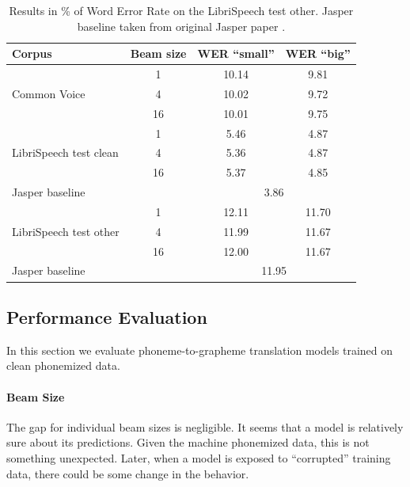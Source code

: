 \begin{table}[H]
	\centering
	\begin{tabular}{lc|cc}
		\bf Corpus & \bf Beam size & \bf WER ``small''& \bf WER ``big'' \\
		\hline
		\multirow{3}{*}{Common Voice}    & 1    &10.14    &    9.81    \\
		& 4    & 10.02    &    9.72    \\
		& 16    &10.01    & 9.75    \\
		\hline
		
		\multirow{3}{*}{LibriSpeech test clean}    & 1    &    5.46 &    4.87    \\
		& 4    &  5.36 &    4.87    \\
		& 16     &5.37    & 4.85    \\
		\multicolumn{2}{l|}{Jasper baseline} & \multicolumn{2}{c}{3.86} \\
		\hline
		
		\multirow{3}{*}{LibriSpeech test other}    & 1    &    12.11 &11.70    \\
		& 4    &11.99     &    11.67    \\
		& 16    & 12.00     & 11.67    \\
		\multicolumn{2}{l|}{Jasper baseline} & \multicolumn{2}{c}{11.95} \\
		
	\end{tabular}
	
	\caption{Results in \% of Word Error Rate on the LibriSpeech test other. Jasper baseline taken from original Jasper paper .}
	\label{tab:phon_en}
\end{table}


\subsection{Performance Evaluation}
In this section we evaluate phoneme-to-grapheme translation models trained on clean phonemized data.

\paragraph{Beam Size} The gap for individual beam sizes is negligible. It seems that a model is relatively sure about its predictions. Given the machine phonemized data, this is not something unexpected. Later, when a model is exposed to ``corrupted'' training data, there could be some change in the behavior.

